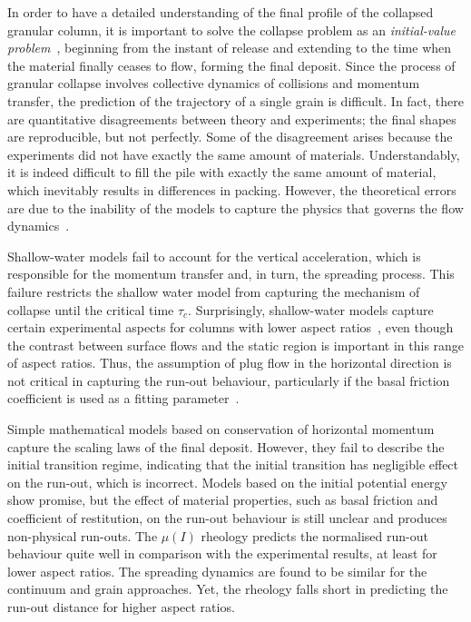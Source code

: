 In order to have a detailed understanding of the final profile of the collapsed 
granular column, it is important to solve the collapse problem as an 
\textit{initial-value problem}~\citep{Balmforth2005}, beginning from the 
instant of release and extending to the time when the material finally ceases 
to flow, forming the final deposit. Since the process of granular collapse 
involves collective dynamics of collisions and momentum transfer, the 
prediction of the trajectory of a single grain is difficult. In fact, there are 
quantitative disagreements between theory and experiments; the final shapes are 
reproducible, but not perfectly. Some of the disagreement arises because the 
experiments did not have exactly the same amount of materials. Understandably, 
it is indeed 
difficult to fill the pile with exactly the same amount of material, which 
inevitably
results in differences in packing. However, the theoretical errors are due to 
the inability of the models to capture the physics that governs the flow 
dynamics~\citep{Balmforth2005}. 

Shallow-water models fail to account for the 
vertical acceleration, which is responsible for the momentum transfer and, in 
turn, the spreading process. This failure restricts the shallow water model 
from capturing the mechanism of collapse until the critical time 
$\tau_{\textit{c}}$. 
Surprisingly, shallow-water models capture certain experimental aspects for 
columns with lower aspect 
ratios~\citep{Mangeney2010,Balmforth2005,Kerswell2005}, even though the 
contrast between surface flows and the static region is important in this range 
of aspect ratios. Thus, the assumption of plug flow in the horizontal direction 
is not critical in capturing the run-out behaviour, particularly if the basal 
friction coefficient is used as a fitting parameter~\citep{Lajeunesse2005}. 

Simple mathematical models based on conservation of horizontal momentum capture 
the scaling laws of the final deposit. However, they fail to describe the 
initial transition regime, indicating that the initial transition has 
negligible effect on the run-out, which is incorrect. Models based on the 
initial potential energy show promise, but the effect of material properties, 
such as basal friction and coefficient of restitution, on the run-out behaviour 
is still unclear and produces non-physical run-outs. The $\mu(\textit{I})$ 
rheology predicts the normalised run-out behaviour quite well in comparison 
with the experimental results, at least for lower aspect ratios. The spreading 
dynamics are found to be similar for the continuum and grain approaches. Yet, 
the rheology falls short in predicting the run-out distance for higher aspect 
ratios. 

